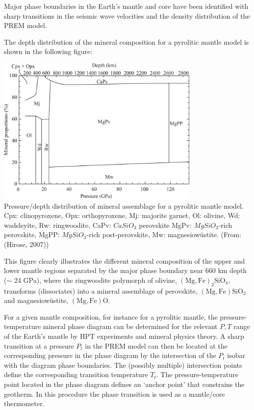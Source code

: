 Major phase boundaries in the Earth's mantle and core have been
identified with sharp transitions in the 
seismic wave velocities and the density distribution of the 
PREM model.

The depth distribution of the mineral composition for a pyrolitic mantle model
is shown in the following figure:

\begin{center}
\includegraphics[width=10cm]{images/gravity/hirose_fig2}\\
{\captionfont
          Pressure/depth distribution of mineral assemblage for a pyrolitic
          mantle model.
          Cpx: clinopyroxene,
          Opx: orthopyroxene,
          Mj: majorite garnet,
          Ol: olivine,
          Wd: wadsleyite,
          Rw: ringwoodite,
          CaPv: $CaSiO_3$ perovskite
          MgPv: $MgSiO_3$-rich perovskite,
          MgPP: $MgSiO_3$-rich post-perovskite,
          Mw: magnesiow\"{u}stite.
(From: (Hirose, 2007))
}
\end{center}

This figure clearly illustrates the different mineral composition 
of the upper and lower mantle regions separated by the major
phase boundary near 660 km depth ($\sim$ 24 GPa),
where the ringwoodite polymorph of olivine, 
$\mathrm{(Mg,Fe)_2SiO_4}$,
transforms (dissociates) into a mineral assemblage of perovskite, 
$\mathrm{(Mg,Fe)SiO_3}$ and
magnesiow\"{u}stite, 
$\mathrm{(Mg,Fe)O}$.

For a given mantle composition, for instance for a pyrolitic mantle,
the pressure-temperature mineral phase diagram can be determined
for the relevant $P,T$ range of the Earth's mantle by HPT experiments
and mineral physics theory.
A sharp transition at a pressure $P_t$ in the PREM model can then be 
located at the corresponding pressure in the phase diagram by the 
intersection of the $P_t$ isobar with the diagram phase boundaries.
The (possibly multiple) intersection points define the corresponding
transition temperature $T_t$. 
The pressure-temperature point located in the phase diagram
defines an `anchor point' that constrains the geotherm.
In this procedure the phase transition is used as a mantle/core 
thermometer.

